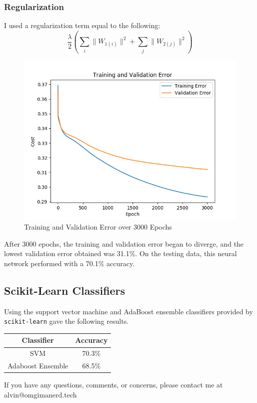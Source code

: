 \documentclass{math}
\begin{document}
\subsubsection*{Regularization}
I used a regularization term equal to the following:
\[ \frac{\lambda}{2}
  \left(\sum_{i}\|W_{1(i)}\|^2+\sum_{j}\|W_{2(j)}\|^2\right) \]
\begin{figure}[H]
  \centering
  \includegraphics[width=12cm]{assets/hw_04_nn_regularized.png}
  \caption{Training and Validation Error over 3000 Epochs}
\end{figure}
After 3000 epochs, the training and validation error began to diverge, and the
lowest validation error obtained was 31.1\%. On the testing data, this neural
network performed with a 70.1\% accuracy.

\subsection*{Scikit-Learn Classifiers}
Using the support vector machine and AdaBoost ensemble classifiers provided by
\texttt{scikit-learn} gave the following results.
\begin{center}
  \begin{tabular}{|c|c|}
    \hline
    Classifier & Accuracy \\
    \hline
    SVM & 70.3\% \\
    Adaboost Ensemble & 68.5\% \\
    \hline
  \end{tabular}
\end{center}

\begin{center}
  If you have any questions, comments, or concerns, please contact me at
  alvin@omgimanerd.tech
\end{center}
\end{document}
